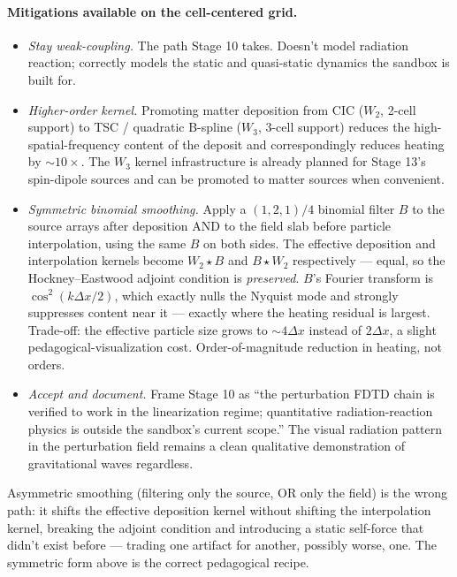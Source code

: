\documentclass[11pt,a4paper]{article}
\begin{document}
\paragraph{Mitigations available on the cell-centered grid.}
\begin{itemize}
  \item \emph{Stay weak-coupling.}  The path Stage 10 takes.  Doesn't
    model radiation reaction; correctly models the
    static and quasi-static dynamics the sandbox is built for.
  \item \emph{Higher-order kernel.}  Promoting matter deposition from CIC
    ($W_2$, 2-cell support) to TSC / quadratic B-spline ($W_3$,
    3-cell support) reduces the high-spatial-frequency content of the
    deposit and correspondingly reduces heating by ${\sim}10\times$.
    The $W_3$ kernel infrastructure is already planned for Stage 13's
    spin-dipole sources and can be promoted to matter sources when
    convenient.
  \item \emph{Symmetric binomial smoothing.}  Apply a $(1,2,1)/4$
    binomial filter $B$ to the source arrays after deposition AND to
    the field slab before particle interpolation, using the same $B$
    on both sides.  The effective deposition and interpolation kernels
    become $W_2 \star B$ and $B \star W_2$ respectively — equal, so the
    Hockney--Eastwood adjoint condition is \emph{preserved}.  $B$'s
    Fourier transform is $\cos^2(k\Delta x/2)$, which exactly nulls the
    Nyquist mode and strongly suppresses content near it — exactly where
    the heating residual is largest.  Trade-off: the effective particle
    size grows to ${\sim}4\Delta x$ instead of $2\Delta x$, a slight
    pedagogical-visualization cost.  Order-of-magnitude reduction in
    heating, not orders.
  \item \emph{Accept and document.}  Frame Stage 10 as ``the
    perturbation FDTD chain is verified to work in the linearization
    regime; quantitative radiation-reaction physics is outside the
    sandbox's current scope.''  The visual radiation pattern in the
    perturbation field remains a clean qualitative demonstration of
    gravitational waves regardless.
\end{itemize}

Asymmetric smoothing (filtering only the source, OR only the field) is
the wrong path: it shifts the effective deposition kernel without
shifting the interpolation kernel, breaking the adjoint condition and
introducing a static self-force that didn't exist before — trading one
artifact for another, possibly worse, one.  The symmetric form above is
the correct pedagogical recipe.
\end{document}
